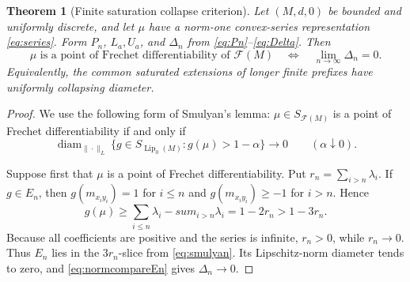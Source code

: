 \documentclass[11pt]{article}
\newtheorem{theorem}{Theorem}
\newcommand{\F}{\mathcal F}
\newcommand{\Lip}{\operatorname{Lip}_0}
\newcommand{\diam}{\operatorname{diam}}
\begin{document}
\begin{theorem}[Finite saturation collapse criterion]
\label{thm:main}
Let $(M,d,0)$ be bounded and uniformly discrete, and let $\mu$ have a
norm-one convex-series representation \eqref{eq:series}. Form $P_n$,
$L_a,U_a$, and $\Delta_n$ from \eqref{eq:Pn}--\eqref{eq:Delta}. Then
\begin{equation}
 \boxed{\quad
 \mu\text{ is a point of Frechet differentiability of }\F(M)
 \quad\Longleftrightarrow\quad
 \lim_{n\to\infty}\Delta_n=0.
 \quad}
 \label{eq:main}
\end{equation}
Equivalently, the common saturated extensions of longer finite prefixes have
uniformly collapsing diameter.
\end{theorem}

\begin{proof}
We use the following form of Smulyan's lemma: $\mu\in S_{\F(M)}$ is a point
of Frechet differentiability if and only if
\begin{equation}
 \diam_{\|\cdot\|_L}\{g\in S_{\Lip(M)}:g(\mu)>1-\alpha\}
 \longrightarrow0
 \qquad(\alpha\downarrow0).
 \label{eq:smulyan}
\end{equation}

Suppose first that $\mu$ is a point of Frechet differentiability. Put
$r_n=\sum_{i>n}\lambda_i$. If $g\in E_n$, then
$g(m_{x_i y_i})=1$ for $i\leq n$ and
$g(m_{x_i y_i})\geq-1$ for $i>n$. Hence
\begin{equation}
 g(\mu)\geq\sum_{i\leq n}\lambda_i-sum_{i>n}\lambda_i
 =1-2r_n>1-3r_n.
 \label{eq:tail}
\end{equation}
Because all coefficients are positive and the series is infinite,
$r_n>0$, while $r_n\to0$. Thus $E_n$ lies in the $3r_n$-slice from
\eqref{eq:smulyan}. Its Lipschitz-norm diameter tends to zero, and
\eqref{eq:normcompareEn} gives $\Delta_n\to0$.


\end{proof}
\end{document}
